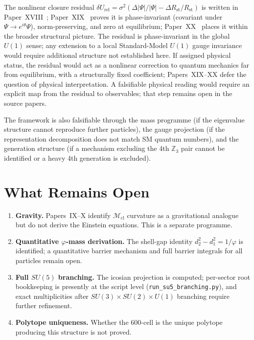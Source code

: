 \documentclass[12pt]{article}
\newcommand{\Mcl}{\mathcal{M}_{\mathrm{cl}}}
\newcommand{\Rst}{R_{\mathrm{st}}}
\begin{document}
The nonlinear closure residual $\delta U_{\mathrm{rel}} = \sigma^2(\Delta|\Psi|/|\Psi| - \Delta\Rst/\Rst)$ is written in Paper~XVIII~\citep{SmartXVIII}; Paper~XIX~\citep{SmartXIX} proves it is phase-invariant (covariant under $\Psi \to e^{i\theta}\Psi$), norm-preserving, and zero at equilibrium; Paper~XX~\citep{SmartXX} places it within the broader structural picture. The residual is phase-invariant in the global $U(1)$ sense; any extension to a local Standard-Model $U(1)$ gauge invariance would require additional structure not established here. If assigned physical status, the residual would act as a nonlinear correction to quantum mechanics far from equilibrium, with a structurally fixed coefficient; Papers~XIX--XX defer the question of physical interpretation. A falsifiable physical reading would require an explicit map from the residual to observables; that step remains open in the source papers.

The framework is also falsifiable through the mass programme (if the eigenvalue structure cannot reproduce further particles), the gauge projection (if the representation decomposition does not match SM quantum numbers), and the generation structure (if a mechanism excluding the 4th $\mathbb{Z}_3$ pair cannot be identified or a heavy 4th generation is excluded).

\section{What Remains Open}\label{sec:open}

\begin{enumerate}
    \item \textbf{Gravity.} Papers~IX--X identify $\Mcl$ curvature as a gravitational analogue but do not derive the Einstein equations. This is a separate programme.
    \item \textbf{Quantitative $\varphi$-mass derivation.} The shell-gap identity $d_2^2 - d_1^2 = 1/\varphi$ is identified; a quantitative barrier mechanism and full barrier integrals for all particles remain open.
    \item \textbf{Full $SU(5)$ branching.} The icosian projection is computed; per-sector root bookkeeping is presently at the script level (\texttt{run\_su5\_branching.py}), and exact multiplicities after $SU(3) \times SU(2) \times U(1)$ branching require further refinement.
    \item \textbf{Polytope uniqueness.} Whether the 600-cell is the unique polytope producing this structure is not proved.
\end{enumerate}
\end{document}
